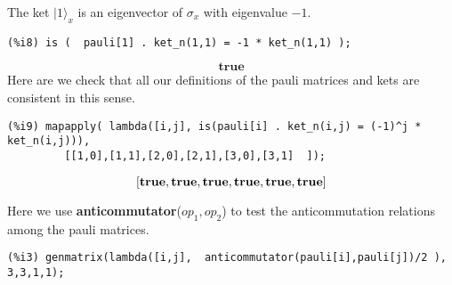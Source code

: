 \documentclass[leqno]{article}
\newcommand{\ket}[1]{{\lvert#1 \rangle}}
\newcommand{\func}[2]{{\bf #1}($#2$)}
\begin{document}
The ket $\ket{1}_x$ is an eigenvector of $\sigma_x$ with eigenvalue $-1$.
\begin{verbatim}
(%i8) is (  pauli[1] . ket_n(1,1) = -1 * ket_n(1,1) );
\end{verbatim}
\begin{dmath}[number={\%o8}]
 \mathbf{true}\end{dmath}
Here are we check that all our definitions of the pauli matrices and kets are
consistent in this sense.
\begin{verbatim}
(%i9) mapapply( lambda([i,j], is(pauli[i] . ket_n(i,j) = (-1)^j * ket_n(i,j))),
         [[1,0],[1,1],[2,0],[2,1],[3,0],[3,1]  ]);
\end{verbatim}
\begin{dmath}[number={\%o9}]
 \left[ \mathbf{true},\linebreak[0]\mathbf{true},\linebreak[0]\mathbf{true},\linebreak[0]\mathbf{true},\linebreak[0]\mathbf{true},\linebreak[0]\mathbf{true} \right] \end{dmath}


Here we use \func{anticommutator}{op_1,op_2} to test the anticommutation relations among
the pauli matrices.
\begin{verbatim}
(%i3) genmatrix(lambda([i,j],  anticommutator(pauli[i],pauli[j])/2 ), 3,3,1,1);
\end{verbatim}
\end{document}
